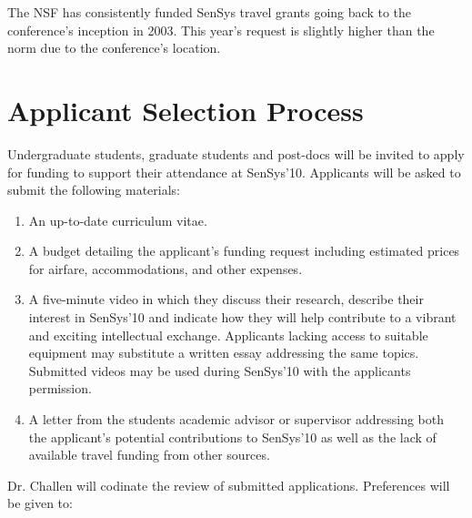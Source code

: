 \documentclass[11pt,letterpaper]{article}
\begin{document}
The NSF has consistently funded SenSys travel grants going back to the
conference's inception in 2003. This year's request is slightly higher than
the norm due to the conference's location.

\section*{Applicant Selection Process}

Undergraduate students, graduate students and post-docs will be invited to
apply for funding to support their attendance at SenSys'10.
Applicants will be asked to submit the following materials:

\vfill\eject

\begin{enumerate}

\item An up-to-date curriculum vitae.

\item A budget detailing the applicant's funding request including estimated
prices for airfare, accommodations, and other expenses.

\item A five-minute video in which they discuss their research, describe
their interest in SenSys'10 and indicate how they will help contribute to a
vibrant and exciting intellectual exchange. Applicants lacking access to
suitable equipment may substitute a written essay addressing the same topics.
Submitted videos may be used during SenSys'10 with the applicants permission.

\item A letter from the students academic advisor or supervisor addressing
both the applicant's potential contributions to SenSys'10 as well as the lack
of available travel funding from other sources.

\end{enumerate}

Dr. Challen will codinate the review of submitted applications.
Preferences will be given to:
\end{document}
